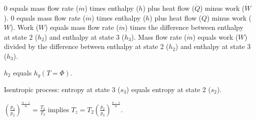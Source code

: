 0 equals mass flow rate (\( \dot{m} \)) times enthalpy (\( h \)) plus heat flow (\( \dot{Q} \)) minus work (\( \dot{W} \)).  
0 equals mass flow rate (\( \dot{m} \)) times enthalpy (\( h \)) plus heat flow (\( \dot{Q} \)) minus work (\( W \)).  
Work (\( W \)) equals mass flow rate (\( \dot{m} \)) times the difference between enthalpy at state 2 (\( h_2 \)) and enthalpy at state 3 (\( h_3 \)).  
Mass flow rate (\( \dot{m} \)) equals work (\( W \)) divided by the difference between enthalpy at state 2 (\( h_2 \)) and enthalpy at state 3 (\( h_3 \)).  

\( h_2 \) equals \( h_g(T = \Phi) \).  

Isentropic process: entropy at state 3 (\( s_3 \)) equals entropy at state 2 (\( s_2 \)).  

\( \left( \frac{p_3}{p_2} \right)^{\frac{n-1}{n}} = \frac{T_3}{T_2} \) implies \( T_z = T_2 \left( \frac{p_2}{p_3} \right)^{\frac{n-1}{n}} \).